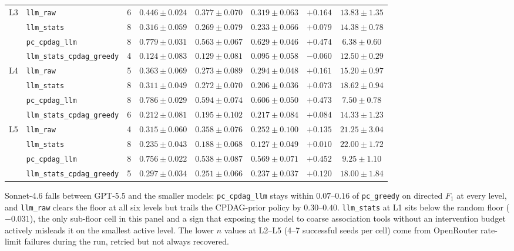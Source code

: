 \begin{center}
\begin{tabular}{@{}l l c c c c c c@{}}
\midrule
L3 & \texttt{llm\_raw}                & 6 & $0.446 \pm 0.024$ & $0.377 \pm 0.070$ & $0.319 \pm 0.063$ & $+0.164$ & $13.83 \pm 1.35$ \\
   & \texttt{llm\_stats}              & 8 & $0.316 \pm 0.059$ & $0.269 \pm 0.079$ & $0.233 \pm 0.066$ & $+0.079$ & $14.38 \pm 0.78$ \\
   & \texttt{pc\_cpdag\_llm}          & 8 & $0.779 \pm 0.031$ & $0.563 \pm 0.067$ & $0.629 \pm 0.046$ & $+0.474$ & $6.38 \pm 0.60$ \\
   & \texttt{llm\_stats\_cpdag\_greedy} & 4 & $0.124 \pm 0.083$ & $0.129 \pm 0.081$ & $0.095 \pm 0.058$ & $-0.060$ & $12.50 \pm 0.29$ \\
\midrule
L4 & \texttt{llm\_raw}                & 5 & $0.363 \pm 0.069$ & $0.273 \pm 0.089$ & $0.294 \pm 0.048$ & $+0.161$ & $15.20 \pm 0.97$ \\
   & \texttt{llm\_stats}              & 8 & $0.311 \pm 0.049$ & $0.272 \pm 0.070$ & $0.206 \pm 0.036$ & $+0.073$ & $18.62 \pm 0.94$ \\
   & \texttt{pc\_cpdag\_llm}          & 8 & $0.786 \pm 0.029$ & $0.594 \pm 0.074$ & $0.606 \pm 0.050$ & $+0.473$ & $7.50 \pm 0.78$ \\
   & \texttt{llm\_stats\_cpdag\_greedy} & 6 & $0.212 \pm 0.081$ & $0.195 \pm 0.102$ & $0.217 \pm 0.084$ & $+0.084$ & $14.33 \pm 1.23$ \\
\midrule
L5 & \texttt{llm\_raw}                & 4 & $0.315 \pm 0.060$ & $0.358 \pm 0.076$ & $0.252 \pm 0.100$ & $+0.135$ & $21.25 \pm 3.04$ \\
   & \texttt{llm\_stats}              & 8 & $0.235 \pm 0.043$ & $0.188 \pm 0.068$ & $0.127 \pm 0.049$ & $+0.010$ & $22.00 \pm 1.72$ \\
   & \texttt{pc\_cpdag\_llm}          & 8 & $0.756 \pm 0.022$ & $0.538 \pm 0.087$ & $0.569 \pm 0.071$ & $+0.452$ & $9.25 \pm 1.10$ \\
   & \texttt{llm\_stats\_cpdag\_greedy} & 5 & $0.297 \pm 0.034$ & $0.251 \pm 0.066$ & $0.237 \pm 0.037$ & $+0.120$ & $18.00 \pm 1.84$ \\
\bottomrule
\end{tabular}
\end{center}

Sonnet-4.6 falls between GPT-5.5 and the smaller models: \texttt{pc\_cpdag\_llm} stays within $0.07$--$0.16$ of \texttt{pc\_greedy} on directed $F_1$ at every level, and \texttt{llm\_raw} clears the floor at all six levels but trails the CPDAG-prior policy by $0.30$--$0.40$. \texttt{llm\_stats} at L1 sits below the random floor ($-0.031$), the only sub-floor cell in this panel and a sign that exposing the model to coarse association tools without an intervention budget actively misleads it on the smallest active level. The lower $n$ values at L2--L5 (4--7 successful seeds per cell) come from OpenRouter rate-limit failures during the run, retried but not always recovered.

